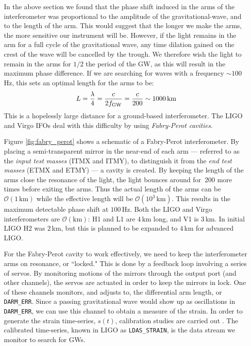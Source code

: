 In the above section we found that the phase shift induced in the arms of the interferometer was proportional to the amplitude of the gravitational-wave, and to the length of the arm. This would suggest that the longer we make the arms, the more sensitive our instrument will be. However, if the light remains in the arm for a full cycle of the gravitational wave, any time dilation gained on the crest of the wave will be cancelled by the trough. We therefore wish the light to remain in the arms for $1/2$ the period of the \ac{GW}, as this will result in the maximum phase difference. If we are searching for waves with a frequency $\sim 100\,$Hz, this sets an optimal length for the arms to be:
\begin{equation}
L = \frac{\lambda}{4} = \frac{c}{2f_{\mathrm{GW}}} = \frac{c}{200} \sim 1000\,\mathrm{km}
\end{equation}
This is a hopelessly large distance for a ground-based interferometer. The LIGO and Virgo \acp{IFO} deal with this difficulty by using \emph{Fabry-Perot cavities}.

Figure \ref{fig:fabry_perot} shows a schematic of a Fabry-Perot interferometer. By placing a semi-transparent mirror in the near-end of each arm --- referred to as the \emph{input test masses} (ITMX and ITMY), to distinguish it from the \emph{end test masses} (ETMX and ETMY) --- a cavity is created. By keeping the length of the arms close the resonance of the light, the light bounces around for $~200$ more times \cite{Brown} before exiting the arms. Thus the actual length of the arms can be $\mathcal{O}(1\,\mathrm{km})$ while the effective length will be $\mathcal{O}(10^3\,\mathrm{km})$. This results in the maximum detectable phase shift at $100\,$Hz. Both the \ac{LIGO} and Virgo interferometers are $\mathcal{O}(\mathrm{km})$: H1 and L1 are $4\,$km long, and V1 is $3\,$km. In initial \ac{LIGO} H2 was $2\,$km, but this is planned to be expanded to $4\,$km for advanced \ac{LIGO}.

For the Fabry-Perot cavity to work effectively, we need to keep the interferometer arms on resonance, or ``locked." This is done by a feedback loop involving a series of servos. By monitoring motions of the mirrors through the output port (and other channels), the servos are actuated in order to keep the mirrors in lock. One of these channels monitors, and adjusts to, the differential arm length, or \verb|DARM_ERR|. Since a passing gravitational wave would show up as oscillations in \verb|DARM_ERR|, we can use this channel to obtain a measure of the strain. In order to generate the strain time-series, $s(t)$, calibration studies are carried out \cite{S5Calibration, BDCali, VirgoS2}. The calibrated time-series, known in \ac{LIGO} as \verb|LDAS_STRAIN|, is the data stream we monitor to search for \acp{GW}.

